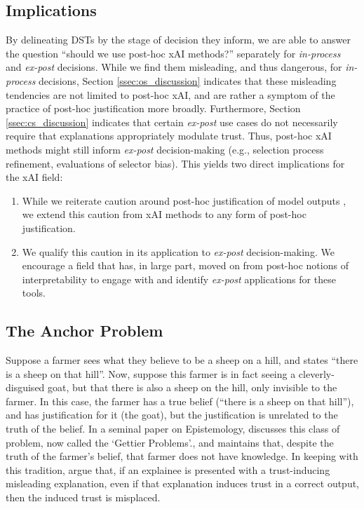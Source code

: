 \subsection{Implications}
By delineating DSTs by the stage of decision they inform, we are able to answer the question ``should we use post-hoc xAI methods?'' separately for \emph{in-process} and \emph{ex-post} decisions. While we find them misleading, and thus dangerous, for \emph{in-process} decisions, Section \ref{ssec:os_discussion} indicates that these misleading tendencies are not limited to post-hoc xAI, and are rather a symptom of the practice of post-hoc justification more broadly. Furthermore, Section \ref{ssec:cs_discussion} indicates that certain \emph{ex-post} use cases do not necessarily require that explanations appropriately modulate trust. Thus, post-hoc xAI methods might still inform \emph{ex-post} decision-making (e.g., selection process refinement, evaluations of selector bias). This yields two direct implications for the xAI field:

\begin{enumerate}
    \item While we reiterate caution around post-hoc justification of model outputs \cite{miller_explainable_2023, Lipton, bansal_does_2021, ford_play_2020, jacobs_how_2021}, we extend this caution from xAI methods to any form of post-hoc justification.
    \item We qualify this caution in its application to \emph{ex-post} decision-making. We encourage a field that has, in large part, moved on from post-hoc notions of interpretability \cite{kumar_problems_2020,barocas_hidden_2020,Lipton,karimi_algorithmic_2021} to engage with and identify \emph{ex-post} applications for these tools.
\end{enumerate}

\subsection{The Anchor Problem}\label{ssec:anchor_problem}
Suppose a farmer sees what they believe to be a sheep on a hill, and states ``there is a sheep on that hill''. Now, suppose this farmer is in fact seeing a cleverly-disguised goat, but that there is also a sheep on the hill, only invisible to the farmer. In this case, the farmer has a true belief (``there is a sheep on that hill''), and has justification for it (the goat), but the justification is unrelated to the truth of the belief. In a seminal paper on Epistemology, \textcite{Gettier_1963} discusses this class of problem, now called the `Gettier Problems'., and maintains that, despite the truth of the farmer's belief, that farmer does not have knowledge. In keeping with this tradition, \textcite{Cabitza_Fregosi_Campagner_Natali_2024} argue that, if an explainee is presented with a trust-inducing misleading explanation, even if that explanation induces trust in a correct output, then the induced trust is misplaced.

